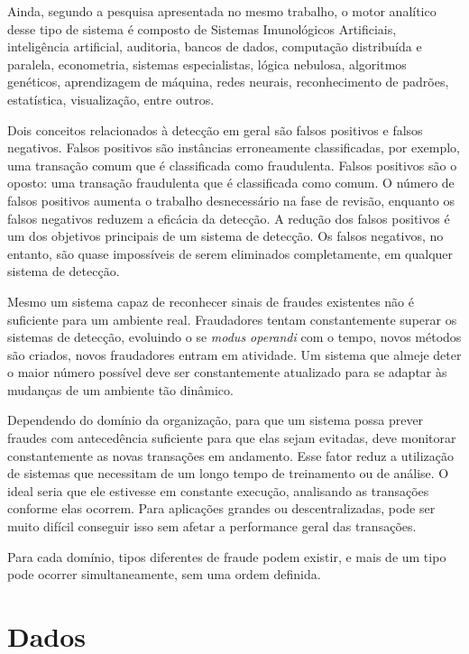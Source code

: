 Ainda, segundo a pesquisa apresentada no mesmo trabalho, o motor analítico desse tipo de sistema é composto de Sistemas Imunológicos Artificiais, inteligência artificial, auditoria, bancos de dados, computação distribuída e paralela, econometria, sistemas especialistas, lógica nebulosa, algoritmos genéticos, aprendizagem de máquina, redes neurais, reconhecimento de padrões, estatística, visualização, entre outros.

Dois conceitos relacionados à detecção em geral são falsos positivos e falsos negativos. Falsos positivos são instâncias erroneamente classificadas, por exemplo, uma transação comum que é classificada como fraudulenta. Falsos positivos são o oposto: uma transação fraudulenta que é classificada como comum. O número de falsos positivos aumenta o trabalho desnecessário na fase de revisão, enquanto os falsos negativos reduzem a eficácia da detecção. A redução dos falsos positivos é um dos objetivos principais de um sistema de detecção. Os falsos negativos, no entanto, são quase impossíveis de serem eliminados completamente, em qualquer sistema de detecção.

Mesmo um sistema capaz de reconhecer sinais de fraudes existentes não é suficiente para um ambiente real. Fraudadores tentam constantemente superar os sistemas de detecção, evoluindo o se \emph{modus operandi} com o tempo, novos métodos são criados, novos fraudadores entram em atividade. Um sistema que almeje deter o maior número possível deve ser constantemente atualizado para se adaptar às mudanças de um ambiente tão dinâmico.

Dependendo do domínio da organização, para que um sistema possa prever fraudes com antecedência suficiente para que elas sejam evitadas, deve monitorar constantemente as novas transações em andamento. Esse fator reduz a utilização de sistemas que necessitam de um longo tempo de treinamento ou de análise. O ideal seria que ele estivesse em constante execução, analisando as transações conforme elas ocorrem. Para aplicações grandes ou descentralizadas, pode ser muito difícil conseguir isso sem afetar a performance geral das transações.

Para cada domínio, tipos diferentes de fraude podem existir, e mais de um tipo pode ocorrer simultaneamente, sem uma ordem definida. 

\section{Dados}


